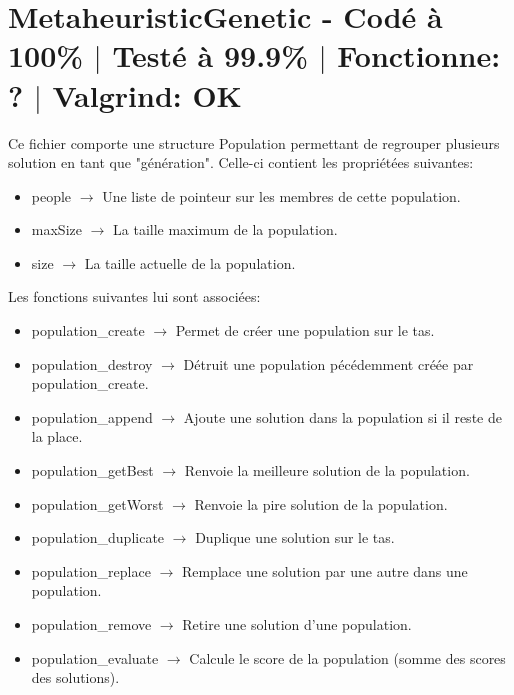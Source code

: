 \documentclass{EPUProjetPeiP}
\newcommand{\comp}[5]{
	\section[#1]{#1 {\small - Codé à #2\% $\vert$ Testé à #3\% $\vert$ Fonctionne: #4 $\vert$ Valgrind: #5}}
}
\begin{document}
\comp{MetaheuristicGenetic}{100}{99.9}{?}{OK}
Ce fichier comporte une structure Population permettant de regrouper plusieurs solution en tant que "génération". Celle-ci contient les propriétées suivantes:
\begin{itemize}
	\item people $\longrightarrow$ Une liste de pointeur sur les membres de cette population.
	\item maxSize $\longrightarrow$ La taille maximum de la population.
	\item size $\longrightarrow$ La taille actuelle de la population.\\
\end{itemize}

Les fonctions suivantes lui sont associées:
\begin{itemize}
	\item population\_create $\longrightarrow$ Permet de créer une population sur le tas.
	\item population\_destroy $\longrightarrow$ Détruit une population pécédemment créée par population\_create.
	\item population\_append $\longrightarrow$ Ajoute une solution dans la population si il reste de la place.
	\item population\_getBest $\longrightarrow$ Renvoie la meilleure solution de la population.
	\item population\_getWorst $\longrightarrow$ Renvoie la pire solution de la population.
	\item population\_duplicate $\longrightarrow$ Duplique une solution sur le tas.
	\item population\_replace $\longrightarrow$ Remplace une solution par une autre dans une population.
	\item population\_remove $\longrightarrow$ Retire une solution d'une population.
	\item population\_evaluate $\longrightarrow$ Calcule le score de la population (somme des scores des solutions).\\
\end{itemize}
\end{document}
